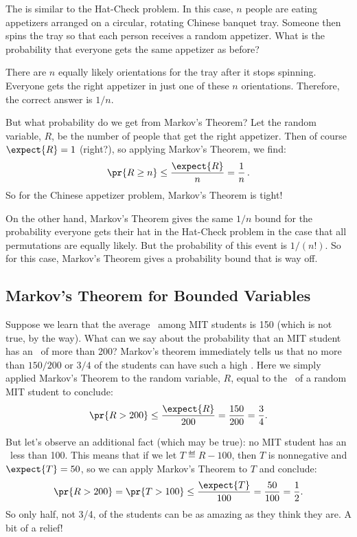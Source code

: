 The  is similar to the Hat-Check problem.
In this case, $n$ people are eating appetizers arranged on a circular,
rotating Chinese banquet tray.  Someone then spins the tray so that each
person receives a random appetizer.  What is the probability that everyone
gets the same appetizer as before?

There are $n$ equally likely orientations for the tray after it stops
spinning.  Everyone gets the right appetizer in just one of these $n$
orientations.  Therefore, the correct answer is $1/n$.

But what probability do we get from Markov's Theorem?  Let the random
variable, $R$, be the number of people that get the right appetizer.
Then of course $\expect{R} = 1$ (right?), so
applying Markov's Theorem, we find:
\begin{displaymath}
  \pr{R \geq n} \leq \frac{\expect{R}}{n} = \frac{1}{n}\,.
\end{displaymath}
So for the Chinese appetizer problem, Markov's Theorem is tight!

On the other hand, Markov's Theorem gives the same $1/n$ bound for the
probability everyone gets their hat in the Hat-Check problem in the case
that all permutations are equally likely.  But the probability of this
event is $1/(n!)$.  So for this case, Markov's Theorem gives a probability
bound that is way off.

\subsection{Markov's Theorem for Bounded Variables}

Suppose we learn that the average \IQ\ among MIT students is 150 (which is
not true, by the way).  What can we say about the probability that an MIT
student has an \IQ\ of more than 200?  Markov's theorem immediately tells
us that no more than $150/200$ or $3/4$ of the students can have such a
high \IQ.  Here we simply applied Markov's Theorem to the random variable,
$R$, equal to the \IQ\ of a random MIT student to conclude:
\[
\pr{R > 200} \leq \frac{\expect{R}}{200}= \frac{150}{200} = \frac{3}{4}.
\]

But let's observe an additional fact (which may be true): no MIT student
has an \IQ\ less than 100.  This means that if we let $T \eqdef R-100$,
then $T$ is nonnegative and $\expect{T} = 50$, so we can apply Markov's
Theorem to $T$ and conclude:
\[
\pr{R > 200} = \pr{T > 100} \leq \frac{\expect{T}}{100}= \frac{50}{100} =
\frac{1}{2}.
\]
So only half, not 3/4, of the students can be as amazing as they think
they are.  A bit of a relief!

